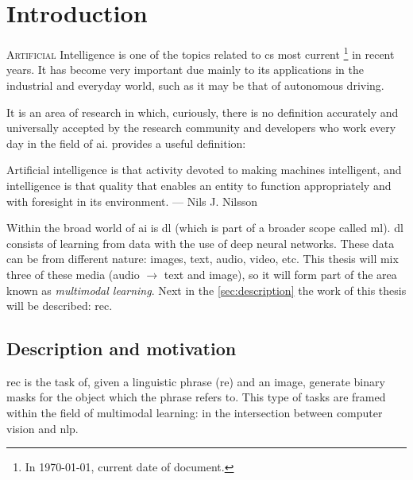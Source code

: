

\chapter{Introduction} \label{cha:intro}


\lettrine{A}{rtificial} Intelligence is one of the topics related to
\gls{cs} most current \footnote{In \today, current date of
  document.} in recent years. It has become very important due
mainly to its applications in the industrial and everyday world, such as
it may be that of autonomous driving.

It is an area of   research in which, curiously, there is no definition
accurately and universally accepted by the research community and
developers who work every day in the field of
\gls{ai}.  provides a useful definition:

\begin{quoteBox}
  Artificial intelligence is that activity devoted to making machines
  intelligent, and intelligence is that quality that enables an entity to
  function appropriately and with foresight in its environment.
  \tcblower
  --- Nils J. Nilsson
\end{quoteBox}

Within the broad world of \gls{ai} is \gls{dl} (which is part of
a broader scope called \gls{ml}). \gls{dl} consists of learning from
data with the use of deep neural networks. These data can be from
different nature: images, text, audio, video, etc. This thesis will mix three
of these media (audio \(\rightarrow\) text and image), so it will form
part of the area known as \emph{multimodal learning}. Next in the
\vref{sec:description} the work of this thesis will be described: \gls{rec}.


\section{Description and motivation} \label{sec:description}

\gls{rec} is the task of, given a linguistic phrase (\gls{re}) and an image,
generate binary masks for the object which the phrase refers to. This type of
tasks are framed within the field of multimodal learning: in the
intersection between computer vision and \gls{nlp}.


